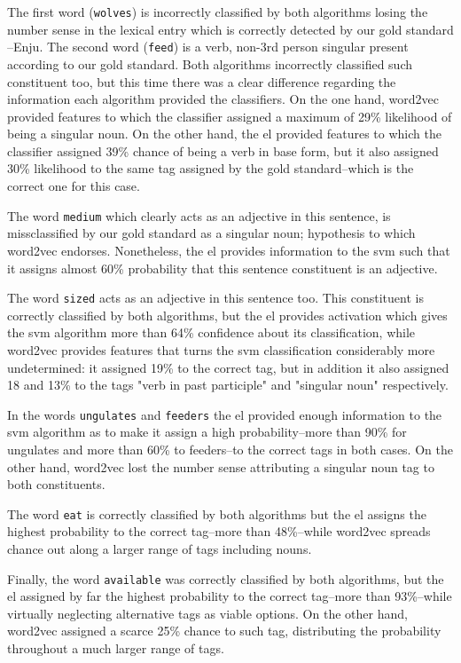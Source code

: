 {The first word (\texttt{wolves}) is incorrectly classified by both algorithms losing the number sense in the lexical entry which is correctly detected by our gold standard --Enju. The second word (\texttt{feed}) is a verb, non-3rd person singular present according to our gold standard. Both algorithms incorrectly classified such constituent too, but this time there was a clear difference regarding the information each algorithm provided the classifiers. On the one hand, word2vec provided features to which the classifier assigned a maximum of 29\% likelihood of being a singular noun. On the other hand, the \gls{el} provided features to which the classifier assigned 39\% chance of being a verb in base form, but it also assigned 30\% likelihood to the same tag assigned by the gold standard--which is the correct one for this case.

The word \texttt{medium} which clearly acts as an adjective in this sentence, is missclassified by our gold standard as a singular noun; hypothesis to which word2vec endorses. Nonetheless, the \gls{el} provides information to the \gls{svm} such that it assigns almost 60\% probability that this sentence constituent is an adjective.

The word \texttt{sized} acts as an adjective in this sentence too. This constituent is correctly classified by both algorithms, but the \gls{el} provides activation which gives the \gls{svm} algorithm more than 64\% confidence about its classification, while word2vec provides features that turns the \gls{svm} classification considerably more undetermined: it assigned 19\% to the correct tag, but in addition it also assigned 18 and 13\% to the tags "verb in past participle" and "singular noun" respectively.

In the words \texttt{ungulates} and \texttt{feeders} the \gls{el} provided enough information to the \gls{svm} algorithm as to make it assign a high probability--more than 90\% for ungulates and more than 60\% to feeders--to the correct tags in both cases. On the other hand, word2vec lost the number sense attributing a singular noun tag to both constituents.

The word \texttt{eat} is correctly classified by both algorithms but the \gls{el} assigns the highest probability to the correct tag--more than 48\%--while word2vec spreads chance out along a larger range of tags including nouns.

Finally, the word \texttt{available} was correctly classified by both algorithms, but the \gls{el} assigned by far the highest probability to the correct tag--more than 93\%--while virtually neglecting alternative tags as viable options. On the other hand, word2vec assigned a scarce 25\% chance to such tag, distributing the probability throughout a much larger range of tags.
}

















